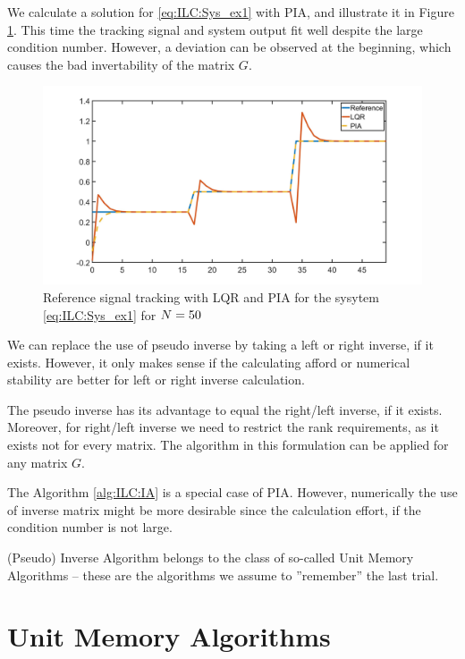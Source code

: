 \begin{exam}
	\label{ex:ILC:PIA}
	We calculate a solution for \eqref{eq:ILC:Sys_ex1} with PIA, and illustrate it in Figure \ref{fig:ILC:Ex1_PIA}. 	
	This time the tracking signal and system output fit well despite the large condition number. However, a deviation can be observed at the beginning, which causes the bad invertability of the matrix $G$. 
	  
	\begin{figure}[ht!]
		\centering
		\includegraphics[width=\textwidth]{fig/Ex1_PIA.jpg}
		\caption{Reference signal tracking with LQR and PIA for the sysytem \eqref{eq:ILC:Sys_ex1} for $N = 50$ }
		\label{fig:ILC:Ex1_PIA}
	\end{figure}
\end{exam}


We can replace the use of pseudo inverse by taking a left or right inverse, if it exists. 
However, it  only makes sense if the calculating afford or numerical stability are better for left or right inverse calculation. 

The pseudo inverse has its advantage to equal the right/left inverse, if it exists. Moreover, for right/left inverse we need to restrict the rank requirements, as it exists not for every matrix. 
The algorithm in this formulation can be applied for any matrix $G$. 

The Algorithm \ref{alg:ILC:IA} is a special case of PIA. However, numerically the use of inverse matrix might be more desirable since the calculation effort, if the condition number is not large. 

(Pseudo) Inverse Algorithm belongs to the class of so-called Unit Memory Algorithms -- these are the algorithms we assume to  ''remember'' the last trial. 

\section{Unit Memory Algorithms}

